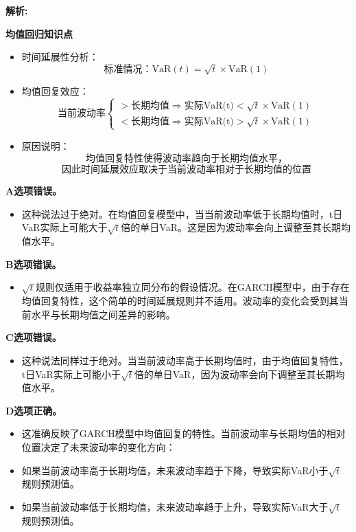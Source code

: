 \documentclass{article}
\newenvironment{explanation}
{\textbf{解析:}\par}
{\par}
\begin{document}
\begin{explanation}

    \textbf{均值回归知识点}
   
\begin{itemize}
    \item 时间延展性分析：
        \[
        \text{标准情况：VaR}(t) = \sqrt{t} \times \text{VaR}(1)
        \]
        
    \item 均值回复效应：
        \[
        \text{当前波动率} \begin{cases}
        > \text{长期均值} \Rightarrow \text{实际VaR(t)} < \sqrt{t} \times \text{VaR}(1) \\
        < \text{长期均值} \Rightarrow \text{实际VaR(t)} > \sqrt{t} \times \text{VaR}(1)
        \end{cases}
        \]

    \item 原因说明：
        \[
        \text{均值回复特性使得波动率趋向于长期均值水平，}
        \]
        \[
        \text{因此时间延展效应取决于当前波动率相对于长期均值的位置}
        \]
\end{itemize}
        \textbf{A选项错误。} 
        \begin{itemize}
            \item 这种说法过于绝对。在均值回复模型中，当当前波动率低于长期均值时，t日VaR实际上可能大于\(\sqrt{t}\)倍的单日VaR。这是因为波动率会向上调整至其长期均值水平。
        \end{itemize}
    
        \textbf{B选项错误。} 
        \begin{itemize}
            \item \(\sqrt{t}\)规则仅适用于收益率独立同分布的假设情况。在GARCH模型中，由于存在均值回复特性，这个简单的时间延展规则并不适用。波动率的变化会受到其当前水平与长期均值之间差异的影响。
        \end{itemize}
    
        \textbf{C选项错误。} 
        \begin{itemize}
            \item 这种说法同样过于绝对。当当前波动率高于长期均值时，由于均值回复特性，t日VaR实际上可能小于\(\sqrt{t}\)倍的单日VaR，因为波动率会向下调整至其长期均值水平。
        \end{itemize}
    
        \textbf{D选项正确。} 
        \begin{itemize}
            \item 这准确反映了GARCH模型中均值回复的特性。当前波动率与长期均值的相对位置决定了未来波动率的变化方向：
            \item 如果当前波动率高于长期均值，未来波动率趋于下降，导致实际VaR小于\(\sqrt{t}\)规则预测值。
            \item 如果当前波动率低于长期均值，未来波动率趋于上升，导致实际VaR大于\(\sqrt{t}\)规则预测值。
        \end{itemize}


\end{explanation}
\end{document}
